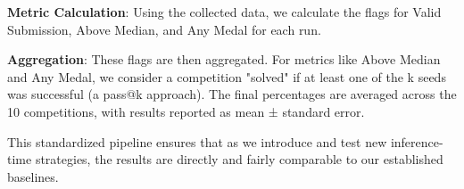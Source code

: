 \textbf{Metric Calculation}: Using the collected data, we calculate the flags for Valid Submission, Above Median, and Any Medal for each run.

\textbf{Aggregation}: These flags are then aggregated. For metrics like Above Median and Any Medal, we consider a competition "solved" if at least one of the k seeds was successful (a pass@k approach). The final percentages are averaged across the 10 competitions, with results reported as mean ± standard error.

This standardized pipeline ensures that as we introduce and test new inference-time strategies, the results are directly and fairly comparable to our established baselines.

